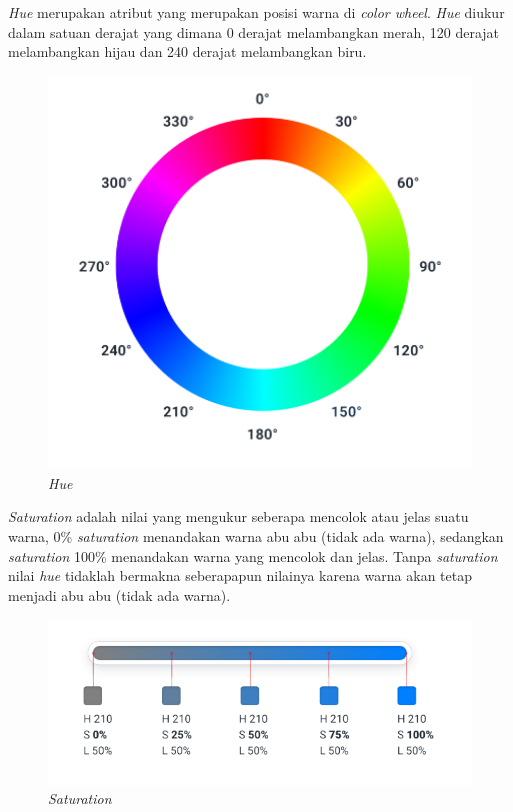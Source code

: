\textit{Hue} merupakan atribut yang merupakan posisi warna di \textit{color wheel}. \textit{Hue} diukur dalam satuan derajat yang dimana 0 derajat melambangkan merah, 120 derajat melambangkan hijau dan 240 derajat melambangkan biru.
\begin{figure}[H]
	{\centering
		\includegraphics[keepaspectratio, width=12cm]{gambar/refactoring-ui-30png.png}
		\caption{\textit{Hue} \citep{refactoringui}}}
	\label{gambar:refactoring-ui-30png.png}
\end{figure}

\textit{Saturation} adalah nilai yang mengukur seberapa mencolok atau jelas suatu warna, 0\% \textit{saturation} menandakan warna abu abu (tidak ada warna),  sedangkan \textit{saturation} 100\% menandakan warna yang mencolok dan jelas. Tanpa \textit{saturation} nilai \textit{hue} tidaklah bermakna seberapapun nilainya karena warna akan tetap menjadi abu abu (tidak ada warna).
\begin{figure}[H]
	{\centering
		\includegraphics[keepaspectratio, width=12cm]{gambar/refactoring-ui-31.png}
		\caption{\textit{Saturation} \citep{refactoringui}}}
	\label{gambar:refactoring-ui-31.png}
\end{figure}

